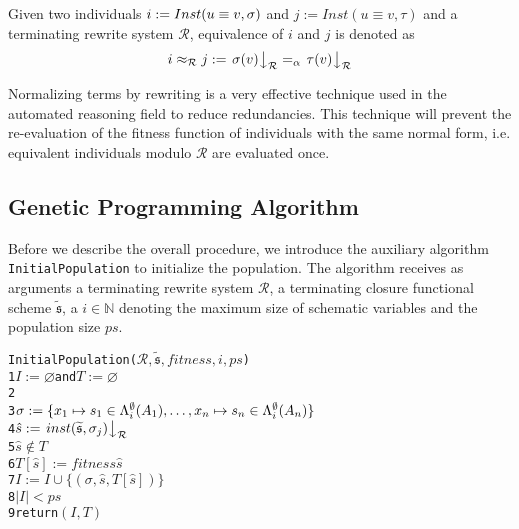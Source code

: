 \begin{defn}
  Given two individuals $i := Inst(u\- \equiv\- v, \sigma)$ and $j:= Inst(u\equiv v, \tau)$ and a terminating rewrite system $\mathcal{R}$, equivalence of $i$ and $j$ is denoted as
  $$
  i \approx_\mathcal{R} j := \left. \sigma(v) \right\downarrow_{\mathcal{R}} =_\alpha \left. \tau(v) \right\downarrow_{\mathcal{R}}
  $$
\end{defn}

Normalizing terms by rewriting is a very effective technique used in the automated reasoning field to reduce redundancies. This technique will prevent the re-evaluation of the fitness function of individuals with the same normal form, i.e. equivalent individuals modulo $\mathcal{R}$ are evaluated once.


\subsection{Genetic Programming Algorithm}
\label{subsec:gp-algorithm}
Before we describe the overall procedure, we introduce the auxiliary algorithm \texttt{InitialPopulation} to initialize the population. The algorithm receives as arguments a terminating rewrite system $\mathcal{R}$, a terminating closure functional scheme $\widetilde{\mathfrak{s}}$, a $i\in\mathbb{N}$ denoting the maximum size of schematic variables and the population size $ps$.

\begin{alltt}
   InitialPopulation(\(\mathcal{R},\widetilde{\mathfrak{s}},fitness,i,ps\))
1  \(I:=\varnothing\) and \(T:=\varnothing\)
2  
3    \(\sigma:=\{x\sb{1}\mapsto{s}\sb{1}\in\Lambda\sb{i}\sp{\emptyset}(A\sb{1}),\ldots,x\sb{n}\mapsto{s}\sb{n}\in\Lambda\sb{i}\sp{\emptyset}(A\sb{n})\}\)
4    \(\hat{s}:=\normal{inst(\widetilde{\mathfrak{s}},\sigma\sb{j})}{\mathcal{R}}\)
5     \(\hat{s}\not\in{T}\) 
6      \(T[\hat{s}]:=fitness \hat{s}\)
7    \(I:=I\cup\{(\sigma,\hat{s},T[\hat{s}])\}\)
8   \(\left\vert{I}\right\vert<{ps}\)
9  return \((I,T)\)
\end{alltt}

